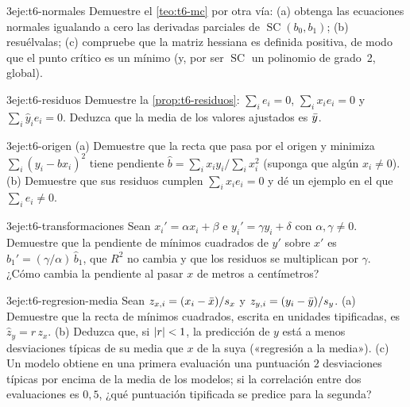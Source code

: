 \begin{ejercicio}{3}{eje:t6-normales}
Demuestre el \cref{teo:t6-mc} por otra vía: (a) obtenga las ecuaciones normales igualando a cero las derivadas parciales de $\operatorname{SC}(b_0,b_1)$; (b) resuélvalas; (c) compruebe que la matriz hessiana es definida positiva, de modo que el punto crítico es un mínimo (y, por ser $\operatorname{SC}$ un polinomio de grado~2, global).
\end{ejercicio}

\begin{ejercicio}{3}{eje:t6-residuos}
Demuestre la \cref{prop:t6-residuos}: $\sum_ie_i=0$, $\sum_ix_ie_i=0$ y $\sum_i\widehat y_ie_i=0$. Deduzca que la media de los valores ajustados es $\bar{y}$.
\end{ejercicio}

\begin{ejercicio}{3}{eje:t6-origen}
(a) Demuestre que la recta que pasa por el origen y minimiza $\sum_i(y_i-bx_i)^{2}$ tiene pendiente $\widehat b=\sum_ix_iy_i\big/\sum_ix_i^{2}$ (suponga que algún $x_i\ne0$). (b) Demuestre que sus residuos cumplen $\sum_ix_ie_i=0$ y dé un ejemplo en el que $\sum_ie_i\neq0$.
\end{ejercicio}

\begin{ejercicio}{3}{eje:t6-transformaciones}
Sean $x_i'=\alpha x_i+\beta$ e $y_i'=\gamma y_i+\delta$ con $\alpha,\gamma\neq0$. Demuestre que la pendiente de mínimos cuadrados de $y'$ sobre $x'$ es $\widehat b_1'=(\gamma/\alpha)\,\widehat b_1$, que $R^{2}$ no cambia y que los residuos se multiplican por $\gamma$. ¿Cómo cambia la pendiente al pasar $x$ de metros a centímetros?
\end{ejercicio}

\begin{ejercicio}{3}{eje:t6-regresion-media}
Sean $z_{x,i}=(x_i-\bar{x})/s_x$ y $z_{y,i}=(y_i-\bar{y})/s_y$. (a) Demuestre que la recta de mínimos cuadrados, escrita en unidades tipificadas, es $\widehat z_y=r\,z_x$. (b) Deduzca que, si $\lvert r\rvert<1$, la predicción de $y$ está a menos desviaciones típicas de su media que $x$ de la suya («regresión a la media»). (c) Un modelo obtiene en una primera evaluación una puntuación $2$ desviaciones típicas por encima de la media de los modelos; si la correlación entre dos evaluaciones es $0{,}5$, ¿qué puntuación tipificada se predice para la segunda?
\end{ejercicio}
